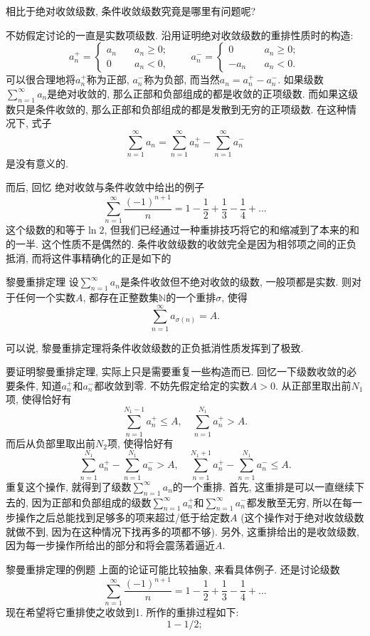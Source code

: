 

相比于绝对收敛级数, 条件收敛级数究竟是哪里有问题呢? 

不妨假定讨论的一直是实数项级数. 沿用证明绝对收敛级数的重排性质时的构造: 
$$
a_n^+=\left\{\begin{array}{cc}
{a_n}\quad &a_n\geq0;\\
0\quad &a_n<0,
\end{array}\right.
\quad\quad
a_n^-=\left\{\begin{array}{cc}
0\quad &a_n\geq0;\\
-a_n\quad &a_n<0.
\end{array}\right.
$$
可以很合理地将$a_n^+$称为正部, $a_n^-$称为负部, 而当然$a_n=a_n^+-a_n^-$. 如果级数$\sum_{n=1}^\infty a_n$是绝对收敛的, 那么正部和负部组成的都是收敛的正项级数. 而如果这级数只是条件收敛的, 那么正部和负部组成的都是发散到无穷的正项级数. 在这种情况下, 式子
$$
\sum_{n=1}^\infty a_n=\sum_{n=1}^\infty a_n^+-\sum_{n=1}^\infty a_n^-
$$
是没有意义的.

而后, 回忆 绝对收敛与条件收敛中给出的例子
$$
\sum_{n=1}^\infty\frac{(-1)^{n+1}}{n}
=1-\frac{1}{2}+\frac{1}{3}-\frac{1}{4}+...
$$
这个级数的和等于$\ln2$, 但我们已经通过一种重排技巧将它的和缩减到了本来的和的一半. 这个性质不是偶然的. 条件收敛级数的收敛完全是因为相邻项之间的正负抵消, 而将这件事精确化的正是如下的

\begin{theorem}{黎曼重排定理}
设$\sum_{n=1}^\infty a_n$是条件收敛但不绝对收敛的级数, 一般项都是实数. 则对于任何一个实数$A$, 都存在正整数集$\mathbb{N}$的一个重排$\sigma$, 使得
$$
\sum_{n=1}^\infty a_{\sigma(n)}=A.
$$
\end{theorem}

可以说, 黎曼重排定理将条件收敛级数的正负抵消性质发挥到了极致.

要证明黎曼重排定理, 实际上只是需要重复一些构造而已. 回忆一下级数收敛的必要条件, 知道$a_n^+$和$a_n^-$都收敛到零. 不妨先假定给定的实数$A>0$. 从正部里取出前$N_1$项, 使得恰好有
\[
\sum_{n=1}^{N_1-1}a_n^+\leq A,
\quad
\sum_{n=1}^{N_1}a_n^+> A.
\]
而后从负部里取出前$N_2$项, 使得恰好有
\[
\sum_{n=1}^{N_1}a_n^+-\sum_{n=1}^{N_1}a_n^-> A,
\quad
\sum_{n=1}^{N_1+1}a_n^+-\sum_{n=1}^{N_1}a_n^-\leq A.
\]
重复这个操作, 就得到了级数$\sum_{n=1}^\infty a_n$的一个重排. 首先, 这重排是可以一直继续下去的, 因为正部和负部组成的级数$\sum_{n=1}^\infty a_n^+$和$\sum_{n=1}^\infty a_n^-$都发散至无穷, 所以在每一步操作之后总能找到足够多的项来超过/低于给定数$A$ (这个操作对于绝对收敛级数就做不到, 因为在这种情况下找再多的项都不够). 另外, 这重排给出的是收敛级数, 因为每一步操作所给出的部分和将会震荡着逼近$A$.

\begin{example}{黎曼重排定理的例题}
上面的论证可能比较抽象, 来看具体例子. 还是讨论级数
$$
\sum_{n=1}^\infty\frac{(-1)^{n+1}}{n}
=1-\frac{1}{2}+\frac{1}{3}-\frac{1}{4}+...
$$
现在希望将它重排使之收敛到1. 所作的重排过程如下:
$$
1-1/2;
$$ 
\end{example}